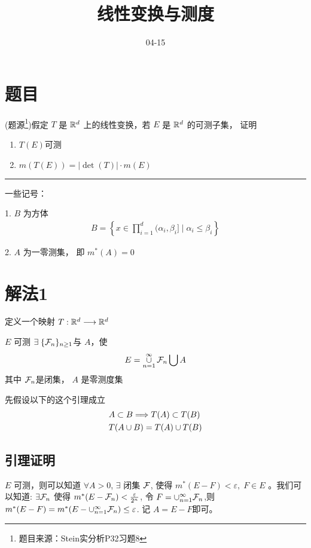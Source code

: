 \documentclass[12pt]{article}
\title{线性变换与测度}
\author{04-15}
\date{}
\begin{document}
\maketitle

\section{题目}
(题源\footnote[1]{题目来源：Stein实分析P32习题8})假定 $T$ 是 $\mathbb{R}^d$ 上的线性变换，若 $E$ 是 $\mathbb{R}^d$ 的可测子集，
证明
\begin{enumerate}
    \item $T(E)$可测
    \item $m(T(E)) = \big|\det (T)\big|\cdot m(E)$
\end{enumerate}

\vspace*{3em}
\noindent\rule{.9\linewidth}{1pt}

一些记号：

1. $B$ 为方体 
\begin{align*}
    B = \left\{x\in \prod_{i=1}^{d}(\alpha_i, \beta_i]\;\bigg|\;\alpha_i\le \beta_i\right\}
\end{align*}

2. $A$ 为一零测集， 即 $m^*(A) = 0$



\clearpage
\section{解法1}
定义一个映射 $T:\mathbb{R}^d \longrightarrow \mathbb{R}^d$
\begin{Definition}[引理1]
    $E$ 可测 \equ $\exists\; \{\mathcal{F}_n\}_{n\ge 1}$与 $A$，使
    \begin{align}
        E = \mathop{\cup}\limits_{n=1}^{\infty}\mathcal{F}_n\bigcup A
    \end{align}
     其中 $\mathcal{F}_n$是闭集， $A$ 是零测度集
\end{Definition}

\begin{Definition}[引理2]
    先假设以下的这个引理成立
    \begin{align}
        & A \subset B \Longrightarrow T(A) \subset T(B) \notag \\
        & T(A\cup B) = T(A) \cup T(B)
    \end{align}
\end{Definition}

\subsection{引理证明}
$E$ 可测，则可以知道 $\forall A> 0$, $\exists$ 闭集  $\mathcal{F}$, 使得
$m^*(E-F) < \varepsilon,\; F\in E$ 。我们可以知道: $\exists \mathcal{F}_n$
使得 $m^*(E-\mathcal{F}_n) < \frac{\varepsilon}{2^n}$,
令  $F = \cup_{n=1}^{\infty}{\mathcal{F}_n}$,则 $m^*(E-F) = m^*(E-\cup_{n=1}^{\infty}{\mathcal{F}_n}) \le \varepsilon$.
记 $A = E-F$即可。
\end{document}
